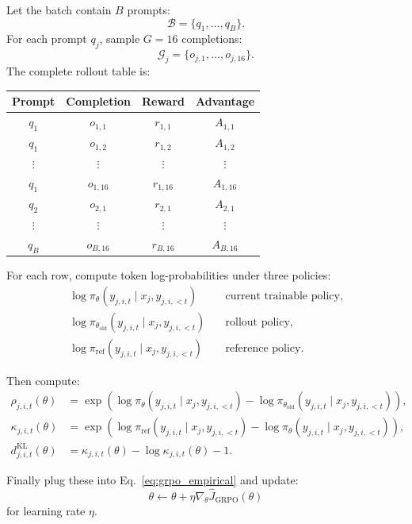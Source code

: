 \documentclass[11pt]{article}
\newcommand{\old}{\mathrm{old}}
\newcommand{\refm}{\mathrm{ref}}
\newcommand{\GRPO}{\mathrm{GRPO}}
\begin{document}
Let the batch contain $B$ prompts:
\begin{equation}
\mathcal{B}=\{q_1,\ldots,q_B\}.
\end{equation}
For each prompt $q_j$, sample $G=16$ completions:
\begin{equation}
\mathcal{G}_j=\{o_{j,1},\ldots,o_{j,16}\}.
\end{equation}
The complete rollout table is:
\begin{center}
\begin{tabular}{@{}c c c c@{}}
\toprule
Prompt & Completion & Reward & Advantage \\
\midrule
$q_1$ & $o_{1,1}$ & $r_{1,1}$ & $A_{1,1}$ \\
$q_1$ & $o_{1,2}$ & $r_{1,2}$ & $A_{1,2}$ \\
$\vdots$ & $\vdots$ & $\vdots$ & $\vdots$ \\
$q_1$ & $o_{1,16}$ & $r_{1,16}$ & $A_{1,16}$ \\
\midrule
$q_2$ & $o_{2,1}$ & $r_{2,1}$ & $A_{2,1}$ \\
$\vdots$ & $\vdots$ & $\vdots$ & $\vdots$ \\
$q_B$ & $o_{B,16}$ & $r_{B,16}$ & $A_{B,16}$ \\
\bottomrule
\end{tabular}
\end{center}

For each row, compute token log-probabilities under three policies:
\begin{align}
\log \pi_\theta(y_{j,i,t}\mid x_j,y_{j,i,<t}) &\quad \text{current trainable policy}, \\
\log \pi_{\theta_{\old}}(y_{j,i,t}\mid x_j,y_{j,i,<t}) &\quad \text{rollout policy}, \\
\log \pi_{\refm}(y_{j,i,t}\mid x_j,y_{j,i,<t}) &\quad \text{reference policy}.
\end{align}

Then compute:
\begin{align}
\rho_{j,i,t}(\theta)
&=\exp\left(
\log\pi_\theta(y_{j,i,t}\mid x_j,y_{j,i,<t})
-
\log\pi_{\theta_{\old}}(y_{j,i,t}\mid x_j,y_{j,i,<t})
\right), \\
\kappa_{j,i,t}(\theta)
&=\exp\left(
\log\pi_{\refm}(y_{j,i,t}\mid x_j,y_{j,i,<t})
-
\log\pi_\theta(y_{j,i,t}\mid x_j,y_{j,i,<t})
\right), \\
d^{\mathrm{KL}}_{j,i,t}(\theta)&=\kappa_{j,i,t}(\theta)-\log\kappa_{j,i,t}(\theta)-1.
\end{align}

Finally plug these into Eq.~\eqref{eq:grpo_empirical} and update:
\begin{equation}
\theta \leftarrow \theta + \eta \nabla_\theta \widehat{J}_{\GRPO}(\theta)
\end{equation}
for learning rate $\eta$.
\end{document}
